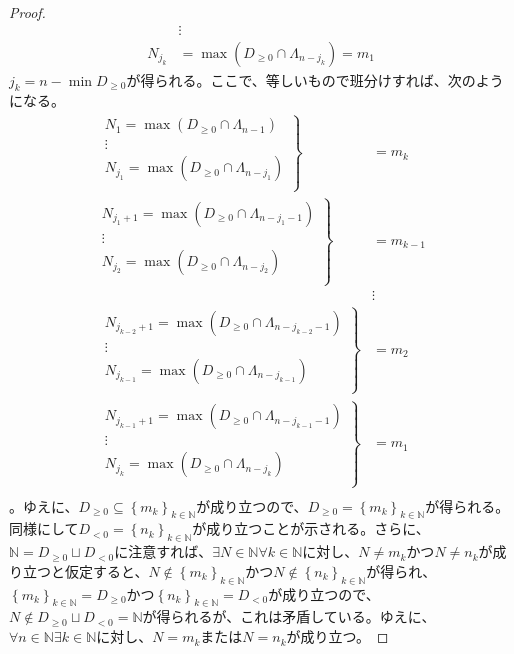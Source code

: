 \documentclass[dvipdfmx]{jsarticle}
\begin{document}
\begin{proof}
{\begin{align*}
&\vdots \\
N_{j_{k}} &= \max\left( D_{\geq 0} \cap \varLambda_{n - j_{k}} \right) = m_{1}
\end{align*}
$j_{k} = n - \min D_{\geq 0}$が得られる。ここで、等しいもので班分けすれば、次のようになる。
\begin{align*}
\left. \ \begin{matrix}
N_{1} = \max\left( D_{\geq 0} \cap \varLambda_{n - 1} \right) \\
\vdots \\
N_{j_{1}} = \max\left( D_{\geq 0} \cap \varLambda_{n - j_{1}} \right) \\
\end{matrix} \right\} &= m_{k}\\
\left. \begin{matrix}
N_{j_{1} + 1} = \max\left( D_{\geq 0} \cap \varLambda_{n - j_{1} - 1} \right) \\
 \vdots \\
N_{j_{2}} = \max\left( D_{\geq 0} \cap \varLambda_{n - j_{2}} \right) \\
\end{matrix} \right\} &= m_{k - 1}\\
&\vdots \\
\left. \ \begin{matrix}
N_{j_{k - 2} + 1} = \max\left( D_{\geq 0} \cap \varLambda_{n - j_{k - 2} - 1} \right) \\
 \vdots \\
N_{j_{k - 1}} = \max\left( D_{\geq 0} \cap \varLambda_{n - j_{k - 1}} \right) \\
\end{matrix} \right\} &= m_{2}\\
\left. \ \begin{matrix}
N_{j_{k - 1} + 1} = \max\left( D_{\geq 0} \cap \varLambda_{n - j_{k - 1} - 1} \right) \\
 \vdots \\
N_{j_{k}} = \max\left( D_{\geq 0} \cap \varLambda_{n - j_{k}} \right) \\
\end{matrix} \right\} &= m_{1}\\
\end{align*}}。ゆえに、$D_{\geq 0} \subseteq \left\{ m_{k} \right\}_{k \in \mathbb{N}}$が成り立つので、$D_{\geq 0} = \left\{ m_{k} \right\}_{k \in \mathbb{N}}$が得られる。同様にして$D_{< 0} = \left\{ n_{k} \right\}_{k \in \mathbb{N}}$が成り立つことが示される。さらに、$\mathbb{N} = D_{\geq 0} \sqcup D_{< 0}$に注意すれば、$\exists N \in \mathbb{N}\forall k \in \mathbb{N}$に対し、$N \neq m_{k}$かつ$N \neq n_{k}$が成り立つと仮定すると、$N \notin \left\{ m_{k} \right\}_{k \in \mathbb{N}}$かつ$N \notin \left\{ n_{k} \right\}_{k \in \mathbb{N}}$が得られ、$\left\{ m_{k} \right\}_{k \in \mathbb{N}} = D_{\geq 0}$かつ$\left\{ n_{k} \right\}_{k \in \mathbb{N}} = D_{< 0}$が成り立つので、$N \notin D_{\geq 0} \sqcup D_{< 0} = \mathbb{N}$が得られるが、これは矛盾している。ゆえに、$\forall n \in \mathbb{N}\exists k \in \mathbb{N}$に対し、$N = m_{k}$または$N = n_{k}$が成り立つ。\par

\end{proof}
\end{document}
